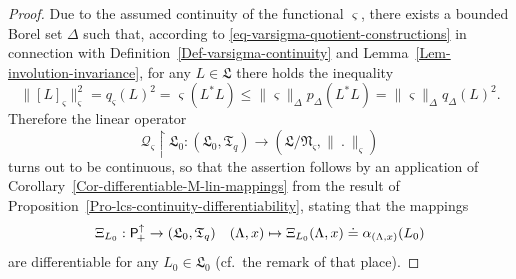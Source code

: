 \documentclass[11pt,twoside,openright]{report}
\theoremstyle{definition}
\theoremstyle{plain}
\theoremstyle{remark}
\theoremstyle{assumption}
\newcommand{\norm}[1]{\lVert #1 \rVert}
\newcommand{\pDx}[1]{p_\Delta ( #1 )}
\newcommand{\qDx}[1]{q_\Delta ( #1 )}
\newcommand{\qsx}[1]{q_\varsigma ( #1 )}
\newcommand{\Lfrak}{\mathfrak{L}}
\newcommand{\Nfrak}{\mathfrak{N}}
\newcommand{\Tfrak}{\mathfrak{T}}
\newcommand{\Qscr}{\mathscr{Q}}
\newcommand{\Poin}{\mathsf{P}_{\negthinspace +}^\uparrow}
\newcommand{\aLax}{\alpha_{( \Lambda , x )}}
\begin{document}
\begin{proof}
  Due to the assumed continuity of the functional $\varsigma$, there
  exists a bounded Borel set $\Delta$ such that, according to
  \eqref{eq-varsigma-quotient-constructions} in connection with
  Definition~\ref{Def-varsigma-continuity} and
  Lemma~\ref{Lem-involution-invariance}, for any $L \in \Lfrak$ there
  holds the inequality
  \begin{equation*}
    \norm{[ L ]_\varsigma}_\varsigma^2 = \qsx{L}^2 = \varsigma ( L^* L
    ) \leqslant \norm{\varsigma}_\Delta \pDx{L^* L} =
    \norm{\varsigma}_\Delta \qDx{L}^2 \text{.}
  \end{equation*}
  Therefore the linear operator
  \begin{equation*}
    \Qscr_\varsigma \restriction \Lfrak_0 : ( \Lfrak_0 , \Tfrak_q)
    \rightarrow ( \Lfrak / \Nfrak_\varsigma , \norm{~.~}_\varsigma )
  \end{equation*}
  turns out to be continuous, so that the assertion follows by an
  application of Corollary~\ref{Cor-differentiable-M-lin-mappings}
  from the result of
  Proposition~\ref{Pro-lcs-continuity-differentiability}, stating that
  the mappings
  \begin{equation*}
    \Xi_{L_0} : \Poin \rightarrow ( \Lfrak_0 , \Tfrak_q ) \quad (
    \Lambda , x ) \mapsto \Xi_{L_0} ( \Lambda , x ) \doteq \aLax ( L_0
    ) 
  \end{equation*}
  are differentiable for any $L_0 \in \Lfrak_0$ (cf.~the remark of
  that place).
\end{proof}
\end{document}
